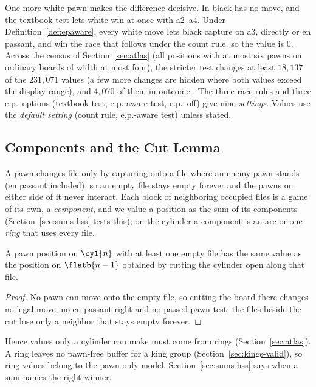 One more white pawn makes the difference decisive. In  black has no move, and the textbook
test lets white win at once with a2--a4. Under Definition~\ref{def:epaware}, every white move lets black capture
on a3, directly or en passant, and win the race that follows under the count rule, so the value is $0$. Across
the census of Section~\ref{sec:atlas} (all positions with at most six pawns on ordinary boards of width at
most four), the stricter test changes at least $18{,}137$ of the $231{,}071$ values (a few more changes are hidden
where both values exceed the display range), and $4{,}070$ of them in outcome . The three race rules and three e.p.\ options (textbook test, e.p.-aware test, e.p.\ off) give nine
\emph{settings}. Values use the \emph{default setting} (count rule, e.p.-aware test) unless
stated.

\subsection{Components and the Cut Lemma}
A pawn changes file only by capturing onto a file where an enemy pawn stands (en passant included), so an empty
file stays empty forever and the pawns on either side of it never interact. Each block of neighboring occupied
files is a game of its own, a \emph{component}, and we value a position as the sum of its components (Section~\ref{sec:sums-hss} tests this); on the cylinder a
component is an arc or one \emph{ring} that uses every file.

\begin{theorem}\label{thm:cut}
A pawn position on $\cyl{n}$ with at least one empty file has the same value as the position on
$\flatb{n-1}$ obtained by cutting the cylinder open along that file.
\end{theorem}

\begin{proof}
No pawn can move onto the empty file, so cutting the board there changes no legal move, no en passant right and
no passed-pawn test: the files beside the cut lose only a neighbor that stays empty forever.
\end{proof}

Hence values only a cylinder can make must come from rings (Section~\ref{sec:atlas}). A ring leaves no
pawn-free buffer for a king group (Section~\ref{sec:kings-valid}), so ring values belong to the pawn-only model.
Section~\ref{sec:sums-hss} says when a sum names the right winner.
